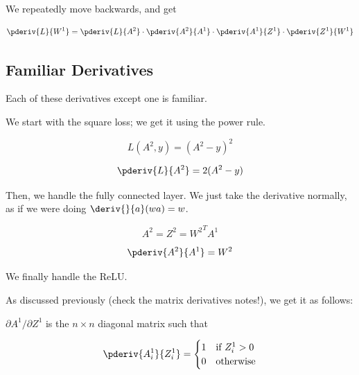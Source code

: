         We repeatedly move backwards, and get
        
        \begin{equation*}
            \pderiv{L}{W^1} = \pderiv{L}{A^2} \cdot \pderiv{A^2}{A^1} \cdot \pderiv{A^1}{Z^1} \cdot \pderiv{Z^1}{W^1} 
        \end{equation*}
        
        
    \subsection{Familiar Derivatives}
        
        Each of these derivatives except one is familiar.
        
        We start with the square loss; we get it using the power rule.
        
        \begin{equation*}
            L(A^2, y) = (A^2-y)^2
        \end{equation*}
        
        \begin{equation}
            \pderiv{L}{A^2} = 2(A^2-y)
        \end{equation}
        
        Then, we handle the fully connected layer. We just take the derivative normally, as if we were doing $\deriv{}{a} (wa) = w$.
        
        \begin{equation}
            A^2 = Z^2 = {W^2}^T A^1
        \end{equation}
        
        \begin{equation*}
            \pderiv{A^2}{A^1} = W^2
        \end{equation*}
        
        We finally handle the ReLU. 
        
        As discussed previously (check the matrix derivatives notes!), we get it as follows:
        
        $\partial A^1/\partial Z^1$ is the $n \times n$ diagonal matrix such that
        
        \begin{eqnarray*}
            \pderiv{A_i^1}{Z_i^1}=
            \begin{cases}
                 1 & \text{if $Z_i^1 > 0$} \\
                 0 & \text{otherwise}
        \end{cases}
        \end{eqnarray*}
        
